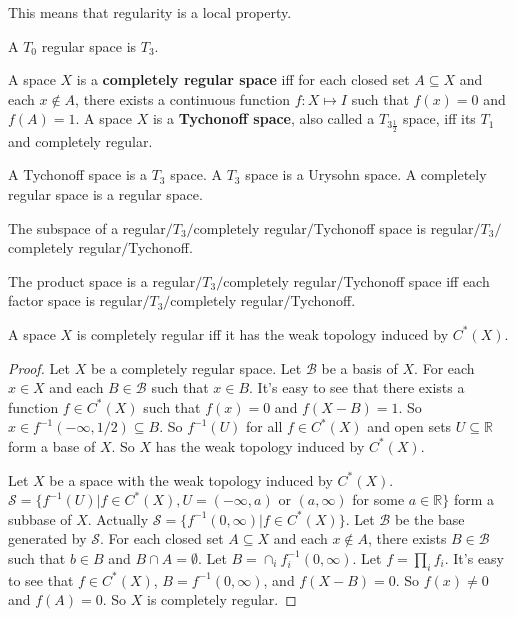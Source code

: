 \documentclass[12pt]{book}
\begin{document}
	This means that regularity is a local property.
	
	\begin{theorem}
		A $T_0$ regular space is $T_3$.
	\end{theorem}
	
	\begin{definition}
		A space $X$ is a {\bf completely regular space} iff for each closed set $A\subseteq X$ and each $x\not \in A$, there exists a continuous function $f:X\mapsto I$ such that $f(x)=0$ and $f(A)=1$. A space $X$ is a {\bf Tychonoff space}, also called a $T_{3\frac 12}$ space, iff its $T_1$ and completely
		 regular.
	\end{definition}
	
	\begin{theorem}
		A Tychonoff space is a $T_3$ space. A $T_3$ space is a Urysohn space. A completely regular space is a regular space.
	\end{theorem}
	
	\begin{theorem}
		The subspace of a regular$/T_3/$completely regular$/$Tychonoff space is regular$/T_3/$ completely regular$/$Tychonoff.
	\end{theorem}
	\begin{theorem}
		The product space is a regular$/T_3/$completely regular$/$Tychonoff space iff each factor space is regular$/T_3/$completely regular$/$Tychonoff.
	\end{theorem}
	
	\begin{theorem}
		A space $X$ is completely regular iff it has the weak topology induced by $C^*(X)$.
	\end{theorem}
	\begin{proof}
		Let $X$ be a completely regular space. Let $\mathcal B$ be a basis of $X$. For each $x\in X$ and each $B\in \mathcal B$ such that $x\in B$. It's easy to see that there exists a function $f\in C^*(X)$ such that $f(x)=0$ and $f(X-B)=1$. So $x\in f^{-1}(-\infty,1/2)\subseteq B$. So $f^{-1}(U)$ for all $f\in C^*(X)$ and open sets $U\subseteq \mathbb R$ form a base of $X$. So $X$ has the weak topology induced by $C^*(X)$.
		
		Let $X$ be a space with the weak topology induced by $C^*(X)$. $\mathcal S=\{f^{-1}(U)|f\in C^*(X),U=(-\infty,a)$ or $(a,\infty)$ for some $a\in\mathbb R\}$ form a subbase of $X$. Actually  $\mathcal S=\{f^{-1}(0,\infty)|f\in C^*(X)\}$. Let $\mathcal B$ be the base generated by $\mathcal S$. For each closed set $A\subseteq X$ and each $x\not \in A$, there exists $B\in \mathcal B$ such that $b\in B$ and $B\cap A=\emptyset$. Let $B=\cap_i f_i^{-1}(0,\infty)$. Let $f=\prod_i f_i$. It's easy to see that $f\in C^*(X)$, $B=f^{-1}(0,\infty)$, and $f(X-B)=0$. So $f(x)\neq 0$ and $f(A)=0$. So $X$ is completely regular.
	\end{proof}
	
\end{document}
